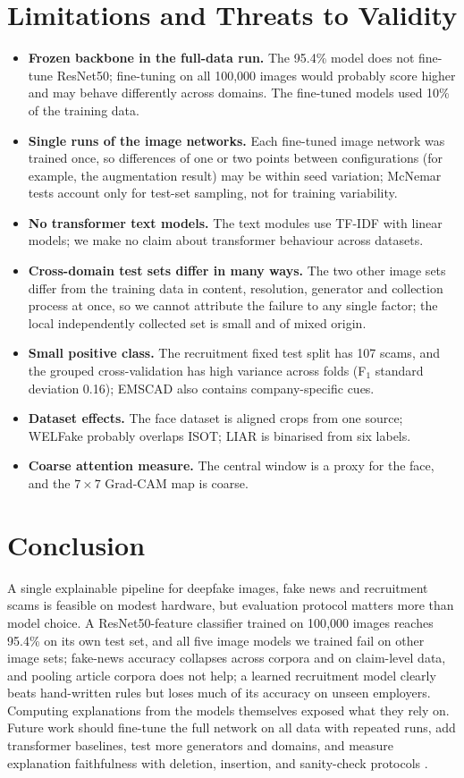 \documentclass[11pt,a4paper]{article}
\begin{document}
\section{Limitations and Threats to Validity}
\label{sec:limits}
\begin{itemize}
\item \textbf{Frozen backbone in the full-data run.} The 95.4\% model does not fine-tune ResNet50; fine-tuning on all 100{,}000 images would probably score higher and may behave differently across domains. The fine-tuned models used 10\% of the training data.
\item \textbf{Single runs of the image networks.} Each fine-tuned image network was trained once, so differences of one or two points between configurations (for example, the augmentation result) may be within seed variation; McNemar tests account only for test-set sampling, not for training variability.
\item \textbf{No transformer text models.} The text modules use TF-IDF with linear models; we make no claim about transformer behaviour across datasets.
\item \textbf{Cross-domain test sets differ in many ways.} The two other image sets differ from the training data in content, resolution, generator and collection process at once, so we cannot attribute the failure to any single factor; the local independently collected set is small and of mixed origin.
\item \textbf{Small positive class.} The recruitment fixed test split has 107 scams, and the grouped cross-validation has high variance across folds (F$_1$ standard deviation 0.16); EMSCAD also contains company-specific cues.
\item \textbf{Dataset effects.} The face dataset is aligned crops from one source; WELFake probably overlaps ISOT; LIAR is binarised from six labels.
\item \textbf{Coarse attention measure.} The central window is a proxy for the face, and the $7\times7$ Grad-CAM map is coarse.
\end{itemize}

\section{Conclusion}
A single explainable pipeline for deepfake images, fake news and recruitment scams is feasible on modest hardware, but evaluation protocol matters more than model choice. A ResNet50-feature classifier trained on 100{,}000 images reaches 95.4\% on its own test set, and all five image models we trained fail on other image sets; fake-news accuracy collapses across corpora and on claim-level data, and pooling article corpora does not help; a learned recruitment model clearly beats hand-written rules but loses much of its accuracy on unseen employers. Computing explanations from the models themselves exposed what they rely on. Future work should fine-tune the full network on all data with repeated runs, add transformer baselines, test more generators and domains, and measure explanation faithfulness with deletion, insertion, and sanity-check protocols \cite{adebayo2018sanity,petsiuk2018rise}.
\end{document}
